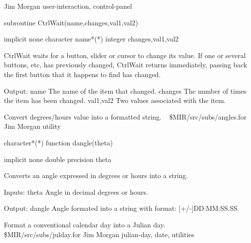 \newline {} Jim Morgan
\newline {} user-interaction, control-panel
\par{\tenpoint
{\eightpoint\begintt
        subroutine CtrlWait(name,changes,val1,val2)

        implicit none
        character name*(*)
        integer changes,val1,val2

  CtrlWait waits for a button, slider or cursor to change its value. If
  one or several buttons, etc, has previously changed, CtrlWait returns
  immediately, passing back the first button that it happens to find
  has changed.

  Output:
    name       The name of the item that changed.
    changes    The number of times the item has been changed.
    val1,val2  Two values associated with the item.
\endtt}
\par}
%
\noindent Convert degrees/hours value into a formatted string.
\newline \ 
\newline {} \$MIR/src/subs/angles.for
\newline {} Jim Morgan
\newline {} utility
\par{\tenpoint
{\eightpoint\begintt
      character*(*) function dangle(theta)

      implicit none
      double precision theta

  Converts an angle expressed in degrees or hours into a string.

  Inputs:
    theta    Angle in decimal degrees or hours.

  Output:
    dangle   Angle formated into a string with format:
               [+/-]DD:MM:SS.SS
\endtt}
\par}
%
\noindent Format a conventional calendar day into a Julian day.
\newline \ 
\newline {} \$MIR/src/subs/julday.for
\newline {} Jim Morgan
\newline \abox{Keywords:} julian-day, date, utilities
